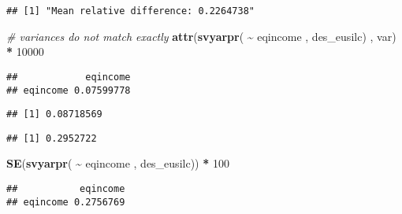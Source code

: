 \documentclass[
]{book}
\newenvironment{Shaded}{\begin{snugshade}}{\end{snugshade}}
\newcommand{\CommentTok}[1]{\textcolor[rgb]{0.56,0.35,0.01}{\textit{#1}}}
\newcommand{\DecValTok}[1]{\textcolor[rgb]{0.00,0.00,0.81}{#1}}
\newcommand{\FunctionTok}[1]{\textcolor[rgb]{0.13,0.29,0.53}{\textbf{#1}}}
\newcommand{\NormalTok}[1]{#1}
\newcommand{\SpecialCharTok}[1]{\textcolor[rgb]{0.81,0.36,0.00}{\textbf{#1}}}
\newcommand{\StringTok}[1]{\textcolor[rgb]{0.31,0.60,0.02}{#1}}
\begin{document}
\begin{verbatim}
## [1] "Mean relative difference: 0.2264738"
\end{verbatim}

\begin{Shaded}
\begin{Highlighting}[]
\CommentTok{\# variances do not match exactly}
\FunctionTok{attr}\NormalTok{(}\FunctionTok{svyarpr}\NormalTok{( }\SpecialCharTok{\textasciitilde{}}\NormalTok{ eqincome , des\_eusilc) , }\StringTok{\textquotesingle{}var\textquotesingle{}}\NormalTok{) }\SpecialCharTok{*} \DecValTok{10000}
\end{Highlighting}
\end{Shaded}

\begin{verbatim}
##            eqincome
## eqincome 0.07599778
\end{verbatim}

\begin{Shaded}
\end{Shaded}

\begin{verbatim}
## [1] 0.08718569
\end{verbatim}

\begin{Shaded}
\end{Shaded}

\begin{verbatim}
## [1] 0.2952722
\end{verbatim}

\begin{Shaded}
\begin{Highlighting}[]
\FunctionTok{SE}\NormalTok{(}\FunctionTok{svyarpr}\NormalTok{( }\SpecialCharTok{\textasciitilde{}}\NormalTok{ eqincome , des\_eusilc)) }\SpecialCharTok{*} \DecValTok{100}
\end{Highlighting}
\end{Shaded}

\begin{verbatim}
##           eqincome
## eqincome 0.2756769
\end{verbatim}
\end{document}
